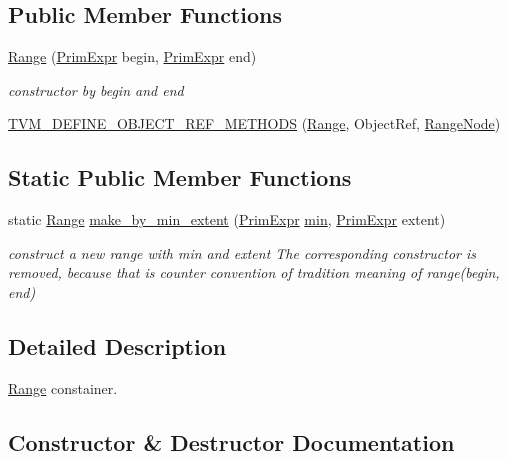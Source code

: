 \subsection*{Public Member Functions}
\begin{DoxyCompactItemize}
\item 
\hyperlink{classtvm_1_1Range_abc08435178fe9ac6ab83db6c9025757c}{Range} (\hyperlink{classtvm_1_1PrimExpr}{Prim\+Expr} begin, \hyperlink{classtvm_1_1PrimExpr}{Prim\+Expr} end)
\begin{DoxyCompactList}\small\item\em constructor by begin and end \end{DoxyCompactList}\item 
\hyperlink{classtvm_1_1Range_ad3ba24148bf1f5121d2f4187343e23a6}{T\+V\+M\+\_\+\+D\+E\+F\+I\+N\+E\+\_\+\+O\+B\+J\+E\+C\+T\+\_\+\+R\+E\+F\+\_\+\+M\+E\+T\+H\+O\+DS} (\hyperlink{classtvm_1_1Range}{Range}, Object\+Ref, \hyperlink{classtvm_1_1RangeNode}{Range\+Node})
\end{DoxyCompactItemize}
\subsection*{Static Public Member Functions}
\begin{DoxyCompactItemize}
\item 
static \hyperlink{classtvm_1_1Range}{Range} \hyperlink{classtvm_1_1Range_a891949f0248812b71ebcde54ac4345cd}{make\+\_\+by\+\_\+min\+\_\+extent} (\hyperlink{classtvm_1_1PrimExpr}{Prim\+Expr} \hyperlink{namespacetvm_a9da780393e228969f77aa7550520a582}{min}, \hyperlink{classtvm_1_1PrimExpr}{Prim\+Expr} extent)
\begin{DoxyCompactList}\small\item\em construct a new range with min and extent The corresponding constructor is removed, because that is counter convention of tradition meaning of range(begin, end) \end{DoxyCompactList}\end{DoxyCompactItemize}


\subsection{Detailed Description}
\hyperlink{classtvm_1_1Range}{Range} constainer. 

\subsection{Constructor \& Destructor Documentation}
